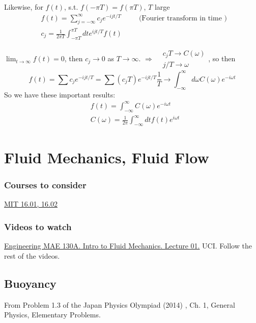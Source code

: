 Likewise, for $f(t)$, s.t. $f(-\pi T) = f(\pi T)$, $T$ large
\[
\begin{aligned}
	& f(t) = \sum_{j=-\infty}^{\infty} c_j e^{-ijt/T} \quad \quad \, \text{ (Fourier transform in time ) } \\
	& c_j = \frac{1}{2\pi T} \int_{-\pi T}^{\pi T} dt e^{ijt/T} f(t) 
\end{aligned}
\]

$\lim_{t\to \infty} f(t) = 0$, then $c_j \to 0$ as $T \to \infty$.  $\Longrightarrow \begin{aligned}
	& c_j T \to C(\omega) \\
	& j/T \to \omega 
\end{aligned}$, so then
\[
f(t) = \sum c_j e^{-ij t/T} = \sum (c_j T) e^{-ijt/T} \frac{1}{T} \to \int_{-\infty}^{\infty} d\omega C(\omega) e^{-i \omega t} 
\]
So we have these important results:
\begin{align}
	& \boxed{ f(t)  = \int_{-\infty}^{\infty} C(\omega) e^{- i\omega t}  }\\
	& \boxed{ C(\omega)  = \frac{1}{2\pi} \int_{-\infty}^{\infty} dt f(t) e^{ i \omega t}  }
\end{align}


\section{Fluid Mechanics, Fluid Flow}

\subsubsection{Courses to consider}

\href{https://ocw.mit.edu/courses/aeronautics-and-astronautics/16-01-unified-engineering-i-ii-iii-iv-fall-2005-spring-2006/fluid-mechanics/}{MIT 16.01, 16.02}

\subsubsection{Videos to watch}

\href{https://youtu.be/pAuQ4Hj2ZrU}{Engineering MAE 130A. Intro to Fluid Mechanics. Lecture 01.} UCI. Follow the rest of the videos.


\subsection{Buoyancy}

From Problem 1.3 of the Japan Physics Olympiad (2014) \cite{dgdt:Japa2014}, Ch. 1, General Physics, Elementary Problems.

